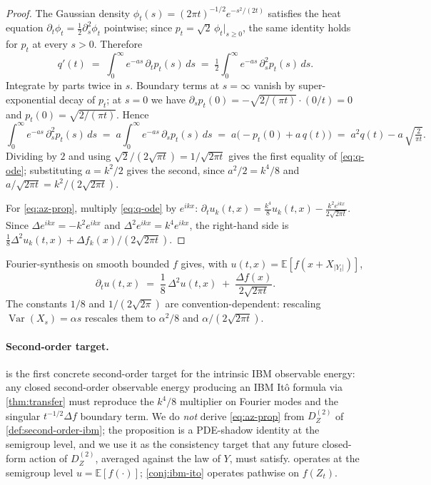 \documentclass[11pt,reqno]{amsart}
\theoremstyle{plain}
\theoremstyle{definition}
\theoremstyle{remark}
\newcommand{\E}{\mathbb{E}}
\newcommand{\IBM}{Z}
\DeclareMathOperator{\Var}{Var}
\begin{document}
\begin{proof}
The Gaussian density $\phi_t(s)=(2\pi t)^{-1/2}e^{-s^{2}/(2t)}$
satisfies the heat equation $\partial_t\phi_t=\tfrac12\partial_s^{2}\phi_t$
pointwise; since $p_t=\sqrt{2}\,\phi_t|_{s\ge 0}$, the same identity
holds for $p_t$ at every $s>0$. Therefore
\[
  q'(t)\;=\;\int_0^\infty e^{-as}\,\partial_t p_t(s)\,ds
   \;=\;\tfrac{1}{2}\int_0^\infty e^{-as}\,\partial_s^{2}p_t(s)\,ds.
\]
Integrate by parts twice in $s$. Boundary terms at $s=\infty$ vanish by
super-exponential decay of $p_t$; at $s=0$ we have
$\partial_s p_t(0)=-\sqrt{2/(\pi t)}\cdot(0/t)=0$ and
$p_t(0)=\sqrt{2/(\pi t)}$. Hence
\[
  \int_0^\infty e^{-as}\,\partial_s^{2}p_t(s)\,ds
  \;=\;a\!\int_0^\infty e^{-as}\,\partial_s p_t(s)\,ds
  \;=\;a\bigl(-p_t(0)+a\,q(t)\bigr)
  \;=\;a^{2}q(t)-a\,\sqrt{\tfrac{2}{\pi t}}.
\]
Dividing by $2$ and using $\sqrt{2}/(2\sqrt{\pi t})=1/\sqrt{2\pi t}$
gives the first equality of \eqref{eq:q-ode}; substituting
$a=k^{2}/2$ gives the second, since $a^{2}/2=k^{4}/8$ and
$a/\sqrt{2\pi t}=k^{2}/(2\sqrt{2\pi t})$.

For \eqref{eq:az-prop}, multiply \eqref{eq:q-ode} by $e^{ikx}$:
$\partial_t u_k(t,x)=\frac{k^{4}}{8}u_k(t,x)-\frac{k^{2}e^{ikx}}{2\sqrt{2\pi t}}$.
Since $\Delta e^{ikx}=-k^{2}e^{ikx}$ and $\Delta^{2}e^{ikx}=k^{4}e^{ikx}$,
the right-hand side is $\tfrac18\Delta^{2}u_k(t,x)+\Delta f_k(x)/(2\sqrt{2\pi t})$.
\end{proof}

Fourier-synthesis on smooth bounded $f$ gives, with $u(t,x)=\E[f(x+X_{|Y_t|})]$,
\begin{equation}\label{eq:az-recap}
  \partial_t u(t,x)
  \;=\;\frac{1}{8}\,\Delta^{2}u(t,x)
       \;+\;\frac{\Delta f(x)}{2\sqrt{2\pi t}}.
\end{equation}
The constants $1/8$ and $1/(2\sqrt{2\pi})$ are convention-dependent:
rescaling $\Var(X_s)=\alpha s$ rescales them to $\alpha^{2}/8$ and
$\alpha/(2\sqrt{2\pi t})$.

\paragraph{Second-order target.}
 is the first concrete second-order target for
the intrinsic IBM observable energy: any closed second-order
observable energy producing an IBM It\^o formula via
\cref{thm:transfer} must reproduce the $k^{4}/8$ multiplier on Fourier
modes and the singular $t^{-1/2}\Delta f$ boundary term. We do
\emph{not} derive \eqref{eq:az-prop} from $D_\IBM^{(2)}$ of
\cref{def:second-order-ibm}; the proposition is a PDE-shadow
identity at the semigroup level, and we use it as the consistency
target that any future closed-form action of $D_\IBM^{(2)}$, averaged
against the law of $Y$, must satisfy.  operates at
the semigroup level $u=\E[f(\cdot)]$; \cref{conj:ibm-ito} operates
pathwise on $f(\IBM_t)$.
\end{document}
